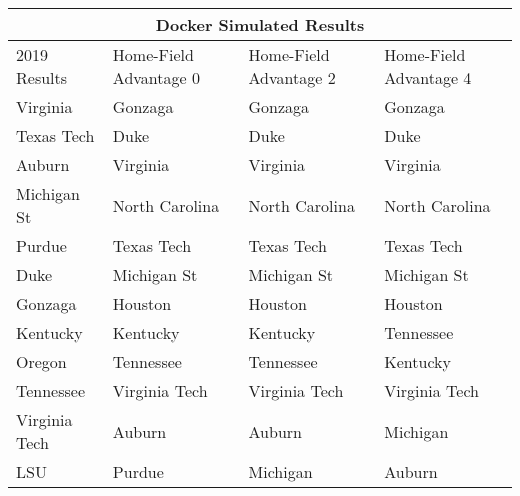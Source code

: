 \begin{tabular}{ |p{2cm}||p{2cm}|p{2cm}|p{2cm}|  }
\hline
\multicolumn{4}{|c|}{Docker Simulated Results} \\
\hline
 2019 Results &  Home-Field Advantage 0 & Home-Field Advantage 2& Home-Field Advantage 4\\
\hline
Virginia & Gonzaga & Gonzaga & Gonzaga\\
\hline
Texas Tech & Duke & Duke & Duke\\
\hline
Auburn & Virginia & Virginia & Virginia\\
\hline
Michigan St & North Carolina & North Carolina & North Carolina\\
\hline
Purdue & Texas Tech & Texas Tech & Texas Tech\\
\hline
Duke & Michigan St & Michigan St & Michigan St\\
\hline
Gonzaga & Houston & Houston & Houston\\
\hline
Kentucky & Kentucky & Kentucky & Tennessee\\
\hline
Oregon & Tennessee & Tennessee & Kentucky\\
\hline
Tennessee & Virginia Tech & Virginia Tech & Virginia Tech\\
\hline
Virginia Tech & Auburn & Auburn & Michigan\\
\hline
LSU & Purdue & Michigan & Auburn\\
\hline
\end{tabular}
